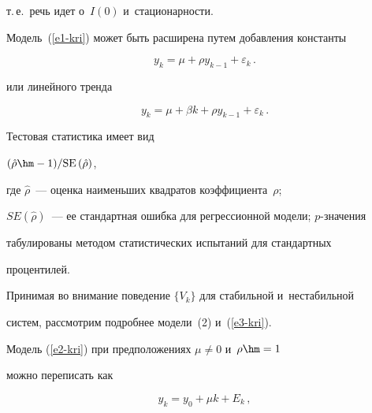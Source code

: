 т.\,е.\ речь идет о~$I(0)$ и~стационарности.





     Модель~(\ref{e1-kri}) может быть расширена путем до\-бав\-ле\-ния константы 


     \begin{equation}


     y_k= \mu +\rho y_{k-1} +\varepsilon_k\,.


     \label{e2-kri}


     \end{equation}


или линейного тренда


\begin{equation}


y_k= \mu+\beta k+ \rho y_{k-1} +\varepsilon_k\,.


\label{e3-kri}


\end{equation}


     


     Тестовая статистика имеет вид


     $(\hat{\rho}\hm-1)/\mathrm{SE}\,(\hat{\rho})$,


где $\hat{\rho}$~--- оценка наименьших квадратов коэффициента~$\rho$; 


$SE(\hat{\rho})$~--- ее стандартная ошибка для регрессионной модели; $p$-зна\-че\-ния


 табулированы методом статистических испытаний для стандартных 


процентилей.


     


     Принимая во внимание поведение $\{V_k\}$ для стабильной и~нестабильной 


сис\-тем, рас\-смот\-рим по\-дроб\-нее модели~(2) и~(\ref{e3-kri}).


     


     Модель (\ref{e2-kri}) при предположениях $\mu\not= 0$ и~$\rho\hm=1$ 


можно переписать как


     \begin{equation}


     y_k= y_0 +\mu k+E_k\,, 


     \label{e4-kri}


     \end{equation}


